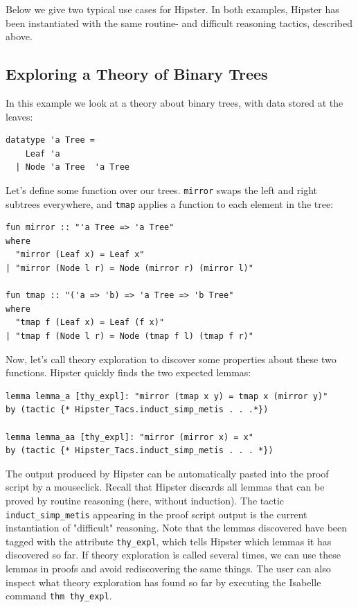 Below we give two typical use cases for Hipster. In both examples, Hipster has been instantiated with the  same routine- and difficult reasoning tactics, described above.

\subsection{Exploring a Theory of Binary Trees}
\label{sec:tree}
In this example we look at a theory about binary trees, with data stored at the leaves:
\begin{verbatim}
datatype 'a Tree = 
    Leaf 'a 
  | Node 'a Tree  'a Tree
\end{verbatim}
Let's define some function over our trees. \texttt{mirror} swaps the left and right subtrees everywhere, and \texttt{tmap} applies a function to each element in the tree:
\begin{verbatim}
fun mirror :: "'a Tree => 'a Tree"
where
  "mirror (Leaf x) = Leaf x"
| "mirror (Node l r) = Node (mirror r) (mirror l)"

fun tmap :: "('a => 'b) => 'a Tree => 'b Tree"
where
  "tmap f (Leaf x) = Leaf (f x)"
| "tmap f (Node l r) = Node (tmap f l) (tmap f r)" 
\end{verbatim} 
Now, let's call theory exploration to discover some properties about these two functions. Hipster quickly finds the two expected lemmas:  
\begin{verbatim}
lemma lemma_a [thy_expl]: "mirror (tmap x y) = tmap x (mirror y)"
by (tactic {* Hipster_Tacs.induct_simp_metis . . .*})

lemma lemma_aa [thy_expl]: "mirror (mirror x) = x"
by (tactic {* Hipster_Tacs.induct_simp_metis . . . *})
\end{verbatim}
The output produced by Hipster can be automatically pasted into the proof script by a mouseclick. Recall that Hipster discards all lemmas that can be proved by routine reasoning (here, without induction). The tactic \texttt{induct\_simp\_metis} appearing in the proof script output is the current instantiation of "difficult" reasoning. Note that the lemmas discovered have been tagged with the attribute \texttt{thy\_expl}, which tells Hipster which lemmas it has discovered so far. If theory exploration is called several times, we can use these lemmas in proofs and avoid rediscovering the same things. The user can also inspect what theory exploration has found so far by executing the Isabelle command \texttt{thm thy\_expl}.

